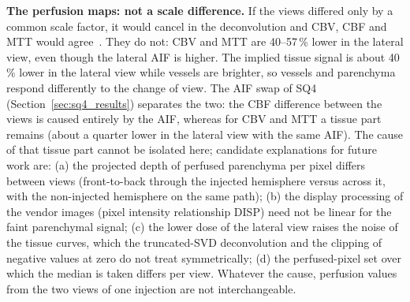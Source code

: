 \textbf{The perfusion maps: not a scale difference.} If the views differed only by a common scale factor, it
would cancel in the deconvolution and CBV, CBF and MTT would agree~\cite{su2023animal}. They do not: CBV and MTT are
40--57\,\% lower in the lateral view, even though the lateral AIF is higher. The implied tissue signal is about
40\,\% lower in the lateral view while vessels are brighter, so vessels and parenchyma respond differently to the
change of view. The AIF swap of SQ4 (Section~\ref{sec:sq4_results}) separates the two: the CBF difference between the
views is caused entirely by the AIF, whereas for CBV and MTT a tissue part remains (about a quarter lower in the lateral
view with the same AIF). The cause of that tissue part cannot be isolated here; candidate explanations for future
work are: (a) the projected
depth of perfused parenchyma per pixel differs between views (front-to-back through the injected hemisphere
versus across it, with the non-injected hemisphere on the same path); (b) the display processing of the vendor
images (pixel intensity relationship DISP) need not be linear for the faint parenchymal signal; (c) the lower dose
of the lateral view raises the noise of the tissue curves, which the truncated-SVD deconvolution and the clipping
of negative values at zero do not treat symmetrically; (d) the perfused-pixel set over which the median is taken
differs per view. Whatever the cause, perfusion values from the two views of one injection are not
interchangeable.

